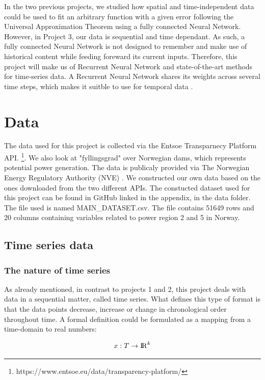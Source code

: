 \documentclass
[twocolumn,
secnumarabic,
nobibnotes,
aps,
prl,
reprint,
groupedaddress,
amsmath,
amssymb,
]{revtex4-2}
\begin{document}
In the two previous projects, we studied how spatial and time-independent data could be used to fit an arbitrary function with a given error following the Universal Approximation Theorem \cite{Nielsen2015} using a fully connected Neural Network. However, in Project 3, our data is sequential and time dependant. As such, a fully connected Neural Network is not designed to remember and make use of historical content while feeding foreward its current inputs. Therefore, this project will make us of Recurrent Neural Network and state-of-the-art methods for time-series data. A Recurrent Neural Network shares its weights across several time steps, which makes it suitble to use for temporal data \cite{Goodfellow2016}.


\section{Data}
The data used for this project is collected via the Entsoe Transparnecy Platform API. \footnote{https://www.entsoe.eu/data/transparency-platform/}. We also look at "fyllingsgrad" over Norwegian dams, which represents potential power generation. The data is publicaly provided via The Norwegian Energy Regulatory Authority (NVE) \cite{noauthor_magasinstatistikk_nodate}. 
We constructed our own data based on the ones downloaded from the two different APIs. The constucted dataset used for this project can be found in GitHub linked in the appendix, in the data folder. The file used is named MAIN\_DATASET.csv. The file contains 51649 rows and 20 columns containing variables related to power region 2 and 5 in Norway.

\subsection{Time series data}
\subsubsection{The nature of time series}
As already mentioned, in contrast to projects 1 and 2, this project deals with data in a sequential matter, called time series. What defines this type of format is that the data points decrease, increase or change in chronological order throughout time\cite{Vishwas2020}.  A formal definition could be formulated as a mapping from a time-domain to real numbers:


\begin{equation}
  x: T \rightarrow  {\rm I\!R}^k 
\end{equation}
\end{document}
